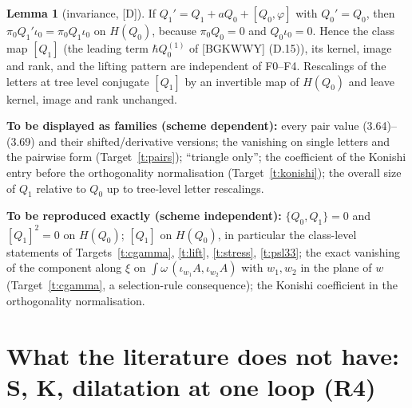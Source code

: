 \documentclass[11pt]{article}
\theoremstyle{definition}
\newtheorem{lemma}{Lemma}
\newcommand{\Dl}{\textup{[D]}}
\begin{document}
\begin{lemma}[invariance, \Dl]\label{lem:inv}
If $Q_1'=Q_1+aQ_0+[Q_0,\varphi]$ with $Q_0'=Q_0$, then $\pi_0Q_1'\iota_0=\pi_0Q_1\iota_0$ on $H(Q_0)$, because $\pi_0Q_0=0$ and $Q_0\iota_0=0$. Hence the class map $[Q_1]$ (the leading term $\hbar Q^{(1)}_0$ of [BGKWWY] (D.15)), its kernel, image and rank, and the lifting pattern are independent of F0--F4. Rescalings of the letters at tree level conjugate $[Q_1]$ by an invertible map of $H(Q_0)$ and leave kernel, image and rank unchanged.
\end{lemma}

\textbf{To be displayed as families (scheme dependent):} every pair value (3.64)--(3.69) and their shifted/derivative versions; the vanishing on single letters and the pairwise form (Target~\ref{t:pairs}); ``triangle only''; the coefficient of the Konishi entry before the orthogonality normalisation (Target~\ref{t:konishi}); the overall size of $Q_1$ relative to $Q_0$ up to tree-level letter rescalings.

\textbf{To be reproduced exactly (scheme independent):} $\{Q_0,Q_1\}=0$ and $[Q_1]^2=0$ on $H(Q_0)$; $[Q_1]$ on $H(Q_0)$, in particular the class-level statements of Targets~\ref{t:cgamma}, \ref{t:lift}, \ref{t:stress}, \ref{t:psl33}; the exact vanishing of the component along $\xi$ on $\int\omega\,(\iota_{w_1}A,\iota_{w_2}A)$ with $w_1,w_2$ in the plane of $w$ (Target~\ref{t:cgamma}, a selection-rule consequence); the Konishi coefficient in the orthogonality normalisation.

\section{What the literature does not have: S, K, dilatation at one loop (R4)}
\end{document}

